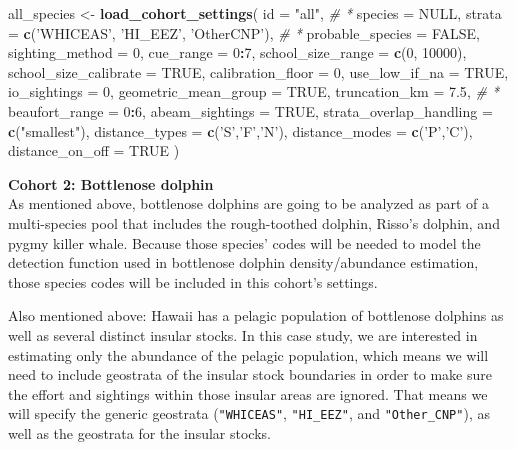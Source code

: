 \documentclass[
]{book}
\newenvironment{Shaded}{\begin{snugshade}}{\end{snugshade}}
\newcommand{\CommentTok}[1]{\textcolor[rgb]{0.56,0.35,0.01}{\textit{#1}}}
\newcommand{\DataTypeTok}[1]{\textcolor[rgb]{0.13,0.29,0.53}{#1}}
\newcommand{\DecValTok}[1]{\textcolor[rgb]{0.00,0.00,0.81}{#1}}
\newcommand{\FloatTok}[1]{\textcolor[rgb]{0.00,0.00,0.81}{#1}}
\newcommand{\KeywordTok}[1]{\textcolor[rgb]{0.13,0.29,0.53}{\textbf{#1}}}
\newcommand{\NormalTok}[1]{#1}
\newcommand{\OperatorTok}[1]{\textcolor[rgb]{0.81,0.36,0.00}{\textbf{#1}}}
\newcommand{\OtherTok}[1]{\textcolor[rgb]{0.56,0.35,0.01}{#1}}
\newcommand{\StringTok}[1]{\textcolor[rgb]{0.31,0.60,0.02}{#1}}
\begin{document}
\begin{Shaded}
\begin{Highlighting}[]
\NormalTok{all_species <-}\StringTok{ }\KeywordTok{load_cohort_settings}\NormalTok{(}
  \DataTypeTok{id =} \StringTok{"all"}\NormalTok{, }\CommentTok{# *}
  \DataTypeTok{species =} \OtherTok{NULL}\NormalTok{, }
  \DataTypeTok{strata =} \KeywordTok{c}\NormalTok{(}\StringTok{'WHICEAS'}\NormalTok{, }\StringTok{'HI_EEZ'}\NormalTok{, }\StringTok{'OtherCNP'}\NormalTok{), }\CommentTok{# *}
  \DataTypeTok{probable_species =} \OtherTok{FALSE}\NormalTok{,}
  \DataTypeTok{sighting_method =} \DecValTok{0}\NormalTok{,}
  \DataTypeTok{cue_range =} \DecValTok{0}\OperatorTok{:}\DecValTok{7}\NormalTok{,}
  \DataTypeTok{school_size_range =} \KeywordTok{c}\NormalTok{(}\DecValTok{0}\NormalTok{, }\DecValTok{10000}\NormalTok{),}
  \DataTypeTok{school_size_calibrate =} \OtherTok{TRUE}\NormalTok{,}
  \DataTypeTok{calibration_floor =} \DecValTok{0}\NormalTok{,}
  \DataTypeTok{use_low_if_na =} \OtherTok{TRUE}\NormalTok{,}
  \DataTypeTok{io_sightings =} \DecValTok{0}\NormalTok{,}
  \DataTypeTok{geometric_mean_group =} \OtherTok{TRUE}\NormalTok{,}
  \DataTypeTok{truncation_km =} \FloatTok{7.5}\NormalTok{, }\CommentTok{# *}
  \DataTypeTok{beaufort_range =} \DecValTok{0}\OperatorTok{:}\DecValTok{6}\NormalTok{,}
  \DataTypeTok{abeam_sightings =} \OtherTok{TRUE}\NormalTok{,}
  \DataTypeTok{strata_overlap_handling =} \KeywordTok{c}\NormalTok{(}\StringTok{"smallest"}\NormalTok{),}
  \DataTypeTok{distance_types =} \KeywordTok{c}\NormalTok{(}\StringTok{'S'}\NormalTok{,}\StringTok{'F'}\NormalTok{,}\StringTok{'N'}\NormalTok{),}
  \DataTypeTok{distance_modes =} \KeywordTok{c}\NormalTok{(}\StringTok{'P'}\NormalTok{,}\StringTok{'C'}\NormalTok{),}
  \DataTypeTok{distance_on_off =} \OtherTok{TRUE}
\NormalTok{)}
\end{Highlighting}
\end{Shaded}

\textbf{Cohort 2: Bottlenose dolphin}\\
As mentioned above, bottlenose dolphins are going to be analyzed as part of a multi-species pool that includes the rough-toothed dolphin, Risso's dolphin, and pygmy killer whale. Because those species' codes will be needed to model the detection function used in bottlenose dolphin density/abundance estimation, those species codes will be included in this cohort's settings.

Also mentioned above: Hawaii has a pelagic population of bottlenose dolphins as well as several distinct insular stocks. In this case study, we are interested in estimating only the abundance of the pelagic population, which means we will need to include geostrata of the insular stock boundaries in order to make sure the effort and sightings within those insular areas are ignored. That means we will specify the generic geostrata (\texttt{"WHICEAS"}, \texttt{"HI\_EEZ"}, and \texttt{"Other\_CNP"}), as well as the geostrata for the insular stocks.
\end{document}

